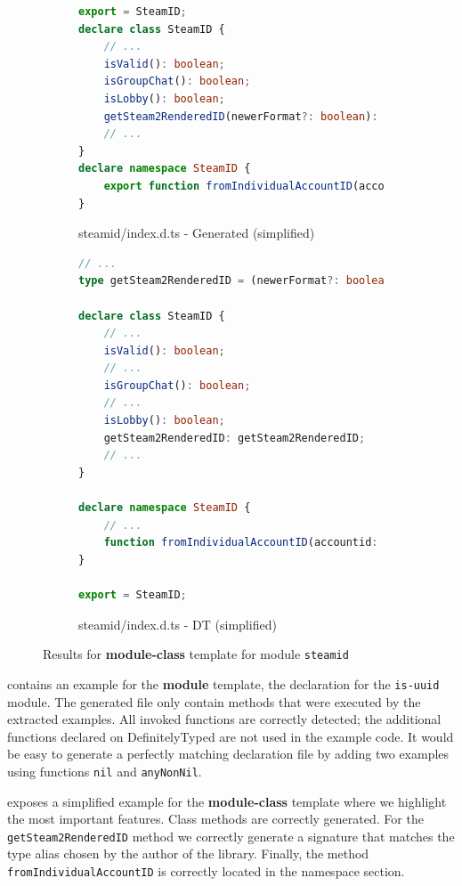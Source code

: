 \documentclass[sigconf]{acmart}
\begin{document}
\begin{figure}[tp]
  \centering
  \begin{subfigure}[t]{0.48\linewidth}
    \begin{lstlisting}[language=TypeScript,numbers=none]
export = SteamID;
declare class SteamID {
    // ...
    isValid(): boolean;
    isGroupChat(): boolean;
    isLobby(): boolean;
    getSteam2RenderedID(newerFormat?: boolean): string;
    // ...
}
declare namespace SteamID {
    export function fromIndividualAccountID(accountid: string | number): SteamID;
}  
    \end{lstlisting}
    \caption{steamid/index.d.ts - Generated (simplified)}
  \end{subfigure}
  \hfill
  \begin{subfigure}[t]{0.48\linewidth}
    \begin{lstlisting}[language=TypeScript,numbers=none]
// ...
type getSteam2RenderedID = (newerFormat?: boolean) => string;

declare class SteamID {
    // ...
    isValid(): boolean;
    // ...
    isGroupChat(): boolean;
    // ...
    isLobby(): boolean;
    getSteam2RenderedID: getSteam2RenderedID;
    // ...
}

declare namespace SteamID {
    // ...
    function fromIndividualAccountID(accountid: number | string): SteamID;
}

export = SteamID;
    \end{lstlisting}
    \caption{steamid/index.d.ts - DT (simplified)}
  \end{subfigure}

  \caption{Results for \textbf{module-class} template for module \texttt{steamid}}
  \label{fig:experiments-results-module-steamid}
\end{figure}

 contains an example
for the \textbf{module} template, the declaration for the \texttt{is-uuid} module.
The generated file only contain methods that were executed by the extracted
examples. All invoked functions are correctly detected; the additional
functions declared on DefinitelyTyped are not used in the example
code.
It would be easy to generate a perfectly matching declaration file by
adding two examples using functions \texttt{nil} and
\texttt{anyNonNil}. 

 exposes a simplified example for the
\textbf{module-class} template where we highlight the most important features. Class methods are
correctly generated. For the \texttt{getSteam2RenderedID} method we correctly generate a signature
that matches the type alias chosen by the author of the library. Finally, the method \texttt{fromIndividualAccountID}
is correctly located in the namespace section.
\end{document}
